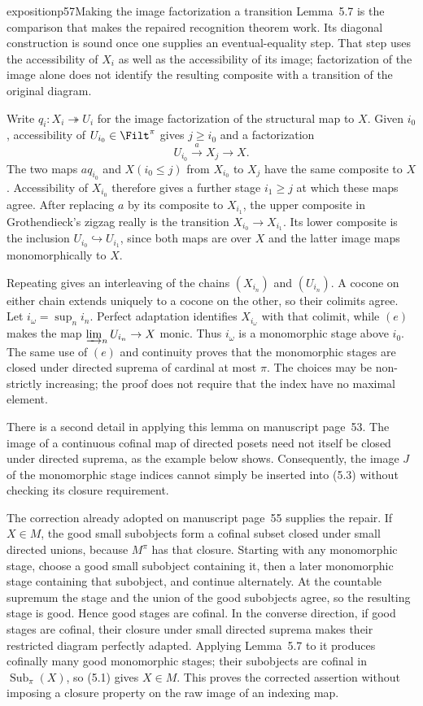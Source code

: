 \begin{dcomment}{exposition}{p57}{Making the image factorization a transition}
Lemma~5.7 is the comparison that makes the repaired recognition theorem work. Its diagonal construction is sound once one supplies an eventual-equality step. That step uses the accessibility of $X_i$ as well as the accessibility of its image; factorization of the image alone does not identify the resulting composite with a transition of the original diagram.

Write $q_i:X_i\twoheadrightarrow U_i$ for the image factorization of the structural map to $X$. Given $i_0$, accessibility of $U_{i_0}\in\Filt^\pi$ gives $j\geq i_0$ and a factorization
\[
 U_{i_0}\xrightarrow{a}X_j\longrightarrow X.
\]
The two maps $a q_{i_0}$ and $X(i_0\leq j)$ from $X_{i_0}$ to $X_j$ have the same composite to $X$. Accessibility of $X_{i_0}$ therefore gives a further stage $i_1\geq j$ at which these maps agree. After replacing $a$ by its composite to $X_{i_1}$, the upper composite in Grothendieck's zigzag really is the transition $X_{i_0}\to X_{i_1}$. Its lower composite is the inclusion $U_{i_0}\hookrightarrow U_{i_1}$, since both maps are over $X$ and the latter image maps monomorphically to $X$.

Repeating gives an interleaving of the chains $(X_{i_n})$ and $(U_{i_n})$. A cocone on either chain extends uniquely to a cocone on the other, so their colimits agree. Let $i_\omega=\sup_n i_n$. Perfect adaptation identifies $X_{i_\omega}$ with that colimit, while $(e)$ makes the map $\varinjlim_nU_{i_n}\to X$ monic. Thus $i_\omega$ is a monomorphic stage above $i_0$. The same use of $(e)$ and continuity proves that the monomorphic stages are closed under directed suprema of cardinal at most $\pi$. The choices may be non-strictly increasing; the proof does not require that the index have no maximal element.

There is a second detail in applying this lemma on manuscript page~53. The image of a continuous cofinal map of directed posets need not itself be closed under directed suprema, as the example below shows. Consequently, the image $J$ of the monomorphic stage indices cannot simply be inserted into (5.3) without checking its closure requirement.

The correction already adopted on manuscript page~55 supplies the repair. If $X\in M$, the good small subobjects form a cofinal subset closed under small directed unions, because $M^\pi$ has that closure. Starting with any monomorphic stage, choose a good small subobject containing it, then a later monomorphic stage containing that subobject, and continue alternately. At the countable supremum the stage and the union of the good subobjects agree, so the resulting stage is good. Hence good stages are cofinal. In the converse direction, if good stages are cofinal, their closure under small directed suprema makes their restricted diagram perfectly adapted. Applying Lemma~5.7 to it produces cofinally many good monomorphic stages; their subobjects are cofinal in $\operatorname{Sub}_{\pi}(X)$, so (5.1) gives $X\in M$. This proves the corrected assertion without imposing a closure property on the raw image of an indexing map.
\end{dcomment}

